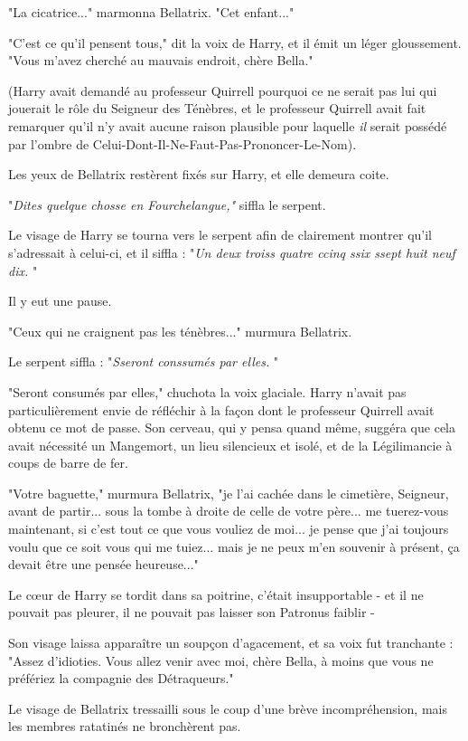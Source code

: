 "La cicatrice..." marmonna Bellatrix. "Cet enfant..."

"C'est ce qu'il pensent tous," dit la voix de Harry, et il émit un léger gloussement. "Vous m'avez cherché au mauvais endroit, chère Bella."

(Harry avait demandé au professeur Quirrell pourquoi ce ne serait pas lui qui jouerait le rôle du Seigneur des Ténèbres, et le professeur Quirrell avait fait remarquer qu'il n'y avait aucune raison plausible pour laquelle \emph{il}  serait possédé par l'ombre de Celui-Dont-Il-Ne-Faut-Pas-Prononcer-Le-Nom).

Les yeux de Bellatrix restèrent fixés sur Harry, et elle demeura coite.

"\emph{Dites quelque chosse en Fourchelangue,"}  siffla le serpent.

Le visage de Harry se tourna vers le serpent afin de clairement montrer qu'il s'adressait à celui-ci, et il siffla : "\emph{Un deux troiss quatre ccinq ssix ssept huit neuf dix.} "

Il y eut une pause.

"Ceux qui ne craignent pas les ténèbres..." murmura Bellatrix.

Le serpent siffla : "\emph{Sseront conssumés par elles.} "

"Seront consumés par elles," chuchota la voix glaciale. Harry n'avait pas particulièrement envie de réfléchir à la façon dont le professeur Quirrell avait obtenu ce mot de passe. Son cerveau, qui y pensa quand même, suggéra que cela avait nécessité un Mangemort, un lieu silencieux et isolé, et de la Légilimancie à coups de barre de fer.

"Votre baguette," murmura Bellatrix, "je l'ai cachée dans le cimetière, Seigneur, avant de partir... sous la tombe à droite de celle de votre père... me tuerez-vous maintenant, si c'est tout ce que vous vouliez de moi... je pense que j'ai toujours voulu que ce soit vous qui me tuiez... mais je ne peux m'en souvenir à présent, ça devait être une pensée heureuse..."

Le cœur de Harry se tordit dans sa poitrine, c'était insupportable - et il ne pouvait pas pleurer, il ne pouvait pas laisser son Patronus faiblir -

Son visage laissa apparaître un soupçon d'agacement, et sa voix fut tranchante : "Assez d'idioties. Vous allez venir avec moi, chère Bella, à moins que vous ne préfériez la compagnie des Détraqueurs."

Le visage de Bellatrix tressailli sous le coup d'une brève incompréhension, mais les membres ratatinés ne bronchèrent pas.

